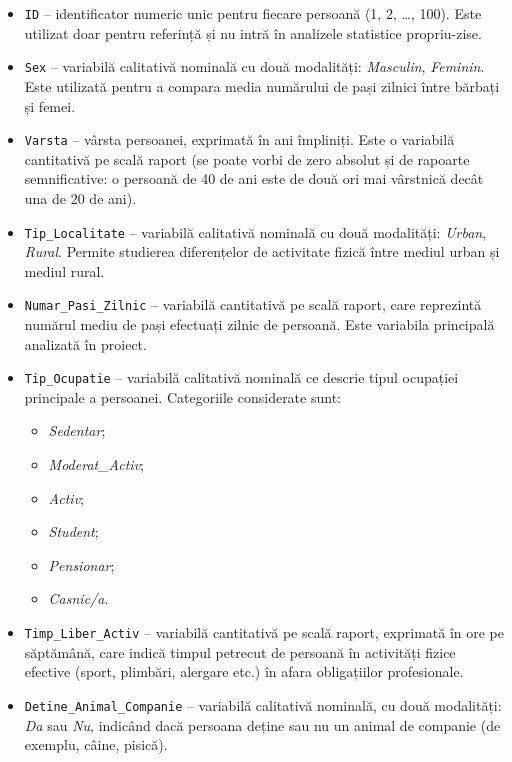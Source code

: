 \documentclass[12pt,a4paper]{report}
\begin{document}
\begin{itemize}[leftmargin=1.2cm]
  \item \texttt{ID} – identificator numeric unic pentru fiecare persoană (1, 2, \dots, 100). Este utilizat doar pentru referință și nu intră în analizele statistice propriu-zise.
  \item \texttt{Sex} – variabilă calitativă nominală cu două modalități: \textit{Masculin}, \textit{Feminin}. Este utilizată pentru a compara media numărului de pași zilnici între bărbați și femei.
  \item \texttt{Varsta} – vârsta persoanei, exprimată în ani împliniți. Este o variabilă cantitativă pe scală raport (se poate vorbi de zero absolut și de rapoarte semnificative: o persoană de 40 de ani este de două ori mai vârstnică decât una de 20 de ani).
  \item \texttt{Tip\_Localitate} – variabilă calitativă nominală cu două modalități: \textit{Urban}, \textit{Rural}. Permite studierea diferențelor de activitate fizică între mediul urban și mediul rural.
  \item \texttt{Numar\_Pasi\_Zilnic} – variabilă cantitativă pe scală raport, care reprezintă numărul mediu de pași efectuați zilnic de persoană. Este variabila principală analizată în proiect.
  \item \texttt{Tip\_Ocupatie} – variabilă calitativă nominală ce descrie tipul ocupației principale a persoanei. Categoriile considerate sunt:
  \begin{itemize}
    \item \textit{Sedentar};
    \item \textit{Moderat\_Activ};
    \item \textit{Activ};
    \item \textit{Student};
    \item \textit{Pensionar};
    \item \textit{Casnic/a}.
  \end{itemize}
  \item \texttt{Timp\_Liber\_Activ} – variabilă cantitativă pe scală raport, exprimată în ore pe săptămână, care indică timpul petrecut de persoană în activități fizice efective (sport, plimbări, alergare etc.) în afara obligațiilor profesionale.
  \item \texttt{Detine\_Animal\_Companie} – variabilă calitativă nominală, cu două modalități: \textit{Da} sau \textit{Nu}, indicând dacă persoana deține sau nu un animal de companie (de exemplu, câine, pisică).
\end{itemize}
\end{document}
